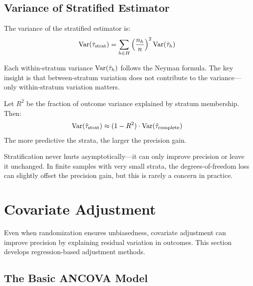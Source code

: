 \subsection{Variance of Stratified Estimator}

The variance of the stratified estimator is:
\begin{equation}
\mathrm{Var}(\hat{\tau}_{\text{strat}}) = \sum_{h \in H} \left(\frac{n_h}{n}\right)^2 \mathrm{Var}(\hat{\tau}_h)
\label{eq:strat_var}
\end{equation}

Each within-stratum variance $\mathrm{Var}(\hat{\tau}_h)$ follows the Neyman formula. The key insight is that between-stratum variation does not contribute to the variance---only within-stratum variation matters.

\begin{proposition}
Let $R^2$ be the fraction of outcome variance explained by stratum membership. Then:
\begin{equation}
\mathrm{Var}(\hat{\tau}_{\text{strat}}) \approx (1 - R^2) \cdot \mathrm{Var}(\hat{\tau}_{\text{complete}})
\end{equation}
The more predictive the strata, the larger the precision gain.
\end{proposition}

\begin{insight}
Stratification never hurts asymptotically---it can only improve precision or leave it unchanged. In finite samples with very small strata, the degrees-of-freedom loss can slightly offset the precision gain, but this is rarely a concern in practice.
\end{insight}


\section{Covariate Adjustment}
\label{sec:cov_adjustment}

Even when randomization ensures unbiasedness, covariate adjustment can improve precision by explaining residual variation in outcomes. This section develops regression-based adjustment methods.

\subsection{The Basic ANCOVA Model}

